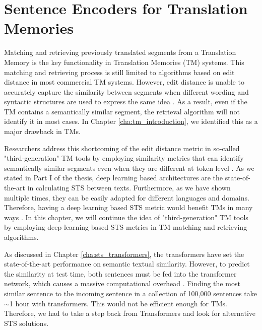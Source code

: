 \chapter{\label{cha:tm_sentence_encoders}Sentence Encoders for Translation Memories}
Matching and retrieving previously translated segments from a Translation Memory is the key functionality in Translation Memories (TM) systems. This matching and retrieving process is still limited to algorithms based on edit distance in most commercial TM systems. However, edit distance is unable to accurately capture the similarity between segments when different wording and syntactic structures are used to express the same idea \autocite{mitkov2008improving}. As a result, even if the TM contains a semantically similar segment, the retrieval algorithm will not identify it in most cases. In Chapter \ref{cha:tm_introduction}, we identified this as a major drawback in TMs.

Researchers address this shortcoming of the edit distance metric in so-called "third-generation" TM tools by employing similarity metrics that can identify semantically similar segments even when they are different at token level \autocite{pekar2007new}. As we stated in Part I of the thesis, deep learning based architectures are the state-of-the-art in calculating STS between texts. Furthermore, as we have shown multiple times, they can be easily adapted for different languages and domains. Therefore, having a deep learning based STS metric would benefit TMs in many ways \autocite{ranasinghe:2021}. In this chapter, we will continue the idea of "third-generation" TM tools by employing deep learning based STS metrics in TM matching and retrieving algorithms. 


As discussed in Chapter \ref{cha:sts_transformers}, the transformers have set the state-of-the-art performance on semantic textual similarity. However, to predict the similarity at test time, both sentences must be fed into the transformer network, which causes a massive computational overhead \autocite{reimers-gurevych-2019-sentence}. Finding the most similar sentence to the incoming sentence in a collection of 100,000 sentences take $\sim$1 hour with transformers. This would not be efficient enough for TMs. Therefore, we had to take a step back from Transformers and look for alternative STS solutions. 

